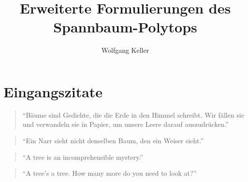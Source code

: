 \documentclass[10p,a4paper,BCOR = 12mm, DIV=15]{scrbook}
\author{Wolfgang Keller}
\title{Erweiterte Formulierungen des Spannbaum-Polytops}
\begin{document}
\newtheorem{Def}{Definition}
\newtheorem{Le}[Def]{Lemma}
\newtheorem{Sa}[Def]{Satz}
\newtheorem{Kor}[Def]{Korollar}
\newtheorem{Pro}[Def]{Problem}
\newtheorem{Bem}[Def]{Bemerkung}
\newtheorem{Bsp}[Def]{Beispiel}
\newtheorem{BspDef}[Def]{Beispiel/Definition}
\newtheorem{Ver}[Def]{Vermutung}

\newcommand{\rec}{\operatorname{rec}}
\newcommand{\cone}{\operatorname{cone}}
\newcommand{\conv}{\operatorname{conv}}
\newcommand{\bild}{\operatorname{bild}}
\newcommand{\rg}{\operatorname{rg}}
\newcommand{\proj}{\operatorname{proj}}
\newcommand{\vertices}{\operatorname{vert}}
\newcommand{\aff}{\operatorname{aff}}
\newcommand{\sgn}{\operatorname{sgn}}
\newcommand{\trace}{\operatorname{tr}}

\newenvironment{bew}{\begin{proof}[Beweis]}{\end{proof}}



\maketitle

\tableofcontents

\chapter*{Eingangszitate}

\begin{quote}
"`Bäume sind Gedichte, die die Erde in den Himmel schreibt. Wir fällen sie und verwandeln sie in Papier, um unsere Leere darauf auszudrücken."' \\
\end{quote}

\begin{quote}
"`Ein Narr sieht nicht denselben Baum, den ein Weiser sieht."' \\
\end{quote}

\begin{quote}
"`A tree is an incomprehensible mystery."' \\
\end{quote}

\begin{quote}
"`A tree's a tree. How many more do you need to look at?"' \\
\end{quote}
\end{document}

